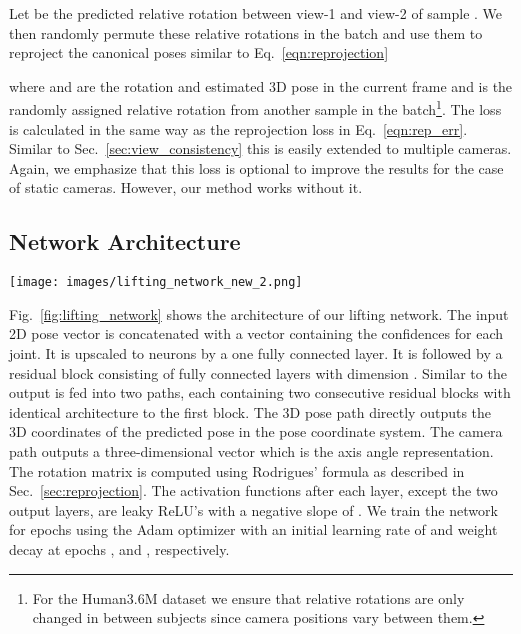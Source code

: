 \documentclass[final]{cvpr}
\begin{document}
Let  be the predicted relative rotation between view-1 and view-2 of sample .
We then randomly permute these relative rotations in the batch and use them to reproject the canonical poses similar to Eq.~\ref{eqn:reprojection} 

where  and  are the rotation and estimated 3D pose in the current frame and  is the randomly assigned relative rotation from another sample in the batch\footnote{For the Human3.6M dataset we ensure that relative rotations are only changed in between subjects since camera positions vary between them.}.
The loss is calculated in the same way as the reprojection loss in Eq.~\ref{eqn:rep_err}.
Similar to Sec.~\ref{sec:view_consistency} this is easily extended to multiple cameras.
Again, we emphasize that this loss is optional to improve the results for the case of static cameras.
However, our method works without it.








\subsection{Network Architecture}
\begin{figure*}
	\centering
	\texttt{[image: images/lifting\_network\_new\_2.png]}
	\caption{Network structure of the lifting network. The 2D input vector contains the - and -coordinates of the 2D pose and the confidence given by the 2D joint detector. It is upscaled using a fully connected layer with  neurons which then goes to a residual block. After that the network splits into two paths that predict the 3D pose in the canonical space and the camera rotation, respectively. Each of the paths has two consecutive residual blocks followed by a fully connected layer that downscales the features to the required size. The Rodrigues block implements Rodrigues formula (Eq.~\ref{eqn:rodrigues}) and has no trainable parameters.}
	\label{fig:lifting_network}
\end{figure*}
Fig.~\ref{fig:lifting_network} shows the architecture of our lifting network.
The input 2D pose vector is concatenated with a vector containing the confidences for each joint.
It is upscaled to  neurons by a one fully connected layer.
It is followed by a residual block consisting of fully connected layers with dimension .
Similar to \cite{WanRos2019a} the output is fed into two paths, each containing two consecutive residual blocks with identical architecture to the first block.
The 3D pose path directly outputs the 3D coordinates of the predicted pose in the pose coordinate system.
The camera path outputs a three-dimensional vector  which is the axis angle representation.
The rotation matrix is computed using Rodrigues' formula as described in Sec.~\ref{sec:reprojection}.
The activation functions after each layer, except the two output layers, are leaky ReLU's with a negative slope of .
We train the network for  epochs using the Adam optimizer with an initial learning rate of  and weight decay at epochs ,  and , respectively.
\end{document}
